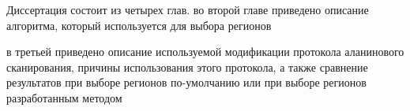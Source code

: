 \intro

Диссертация состоит из четырех глав. 
во второй главе приведено описание алгоритма, который используется для выбора регионов

в третьей приведено описание используемой модификации протокола аланинового сканирования, причины использования этого протокола, а также сравнение результатов при выборе регионов по-умолчанию или при выборе регионов разработанным методом 
